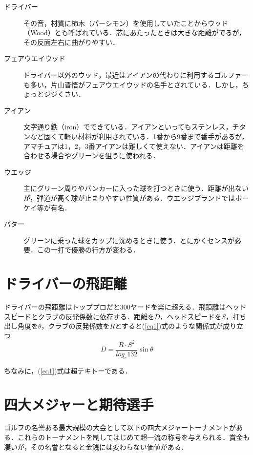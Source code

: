 \documentclass[a4j, twocolumn]{jarticle}
\begin{document}
\begin{description}
    \item[ドライバー]
    その音，材質に柿木（パーシモン）を使用していたことからウッド（Wood）とも呼ばれている．芯にあたったときは大きな距離がでるが，その反面左右に曲がりやすい．

    \item[フェアウエイウッド]
    ドライバー以外のウッド，最近はアイアンの代わりに利用するゴルファーも多い，片山晋悟がフェアウエイウッドの名手とされている．しかし，ちょっとジジくさい．

    \item[アイアン]
    文字通り鉄（iron）でできている．アイアンといってもステンレス，チタンなど固くて軽い材料が利用されている．1番から9番まで番手があるが，アマチュアは1，2，3番アイアンは難しくて使えない．アイアンは距離を合わせる場合やグリーンを狙うに使われる．

    \item[ウエッジ]
    主にグリーン周りやバンカーに入った球を打つときに使う．距離が出ないが，弾道が高く球が止まりやすい性質がある．ウエッジブランドではボーケイ等が有名．

    \item[パター]
    グリーンに乗った球をカップに沈めるときに使う．とにかくセンスが必要．この一打で優勝の行方が変わる．
\end{description}

\section{ドライバーの飛距離}

ドライバーの飛距離はトッププロだと300ヤードを楽に超える．飛距離はヘッドスピードとクラブの反発係数に依存する．距離を$D$，ヘッドスピードを$S$，打ち出し角度を$\theta$，クラブの反発係数を$R$とすると(\ref{eq1})式のような関係式が成り立つ~\cite{bib2}\\
\begin{equation}
    \label{eq1}
    D = \frac{R \cdot S^2}{log_e 132}\sin\theta
\end{equation}

ちなみに，(\ref{eq1})式は超テキトーである．

\section{四大メジャーと期待選手}

ゴルフの名誉ある最大規模の大会として以下の四大メジャートーナメントがある．これらのトーナメントを制してはじめて超一流の称号を与えられる．賞金も凄いが，その名誉となると金銭には変わらない価値がある．\\
\end{document}
